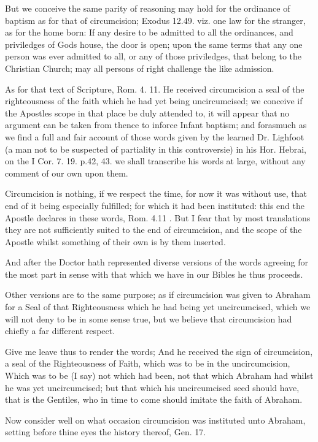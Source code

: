 \documentclass[12pt,a4paper]{book}
\begin{document}
But we conceive the same parity of reasoning may hold for the ordinance of baptism as for that of circumcision; Exodus 12.49. viz. one law for the stranger, as for the home born: If any desire to be admitted to all the ordinances, and priviledges of Gods house, the door is open; upon the same terms that any one person was ever admitted to all, or any of those priviledges, that belong to the Christian Church; may all persons of right challenge the like admission.

As for that text of Scripture, Rom. 4. 11. He received circumcision a seal of the righteousness of the faith which he had yet being uncircumcised; we conceive if the Apostles scope in that place be duly attended to, it will appear that no argument can be taken from thence to inforce Infant baptism; and forasmuch as we find a full and fair account of those words given by the learned Dr. Lighfoot (a man not to be suspected of partiality in this controversie) in his Hor. Hebrai, on the I Cor. 7. 19. p.42, 43. we shall transcribe his words at large, without any comment of our own upon them.

Circumcision is nothing, if we respect the time, for now it was without use, that end of it being especially fulfilled; for which it had been instituted: this end the Apostle declares in these words, Rom. 4.11 . But I fear that by most translations they are not sufficiently suited to the end of circumcision, and the scope of the Apostle whilst something of their own is by them inserted.

And after the Doctor hath represented diverse versions of the words agreeing for the most part in sense with that which we have in our Bibles he thus proceeds.

Other versions are to the same purpose; as if circumcision was given to Abraham for a Seal of that Righteousness which he had being yet uncircumcised, which we will not deny to be in some sense true, but we believe that circumcision had chiefly a far different respect.

Give me leave thus to render the words; And he received the sign of circumcision, a seal of the Righteousness of Faith, which was to be in the uncircumcision, Which was to be (I say) not which had been, not that which Abraham had whilst he was yet uncircumcised; but that which his uncircumcised seed should have, that is the Gentiles, who in time to come should imitate the faith of Abraham.

Now consider well on what occasion circumcision was instituted unto Abraham, setting before thine eyes the history thereof, Gen. 17.
\end{document}
